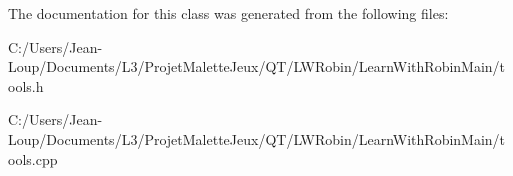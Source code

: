 The documentation for this class was generated from the following files\+:\begin{DoxyCompactItemize}
\item 
C\+:/\+Users/\+Jean-\/\+Loup/\+Documents/\+L3/\+Projet\+Malette\+Jeux/\+Q\+T/\+L\+W\+Robin/\+Learn\+With\+Robin\+Main/tools.\+h\item 
C\+:/\+Users/\+Jean-\/\+Loup/\+Documents/\+L3/\+Projet\+Malette\+Jeux/\+Q\+T/\+L\+W\+Robin/\+Learn\+With\+Robin\+Main/tools.\+cpp\end{DoxyCompactItemize}
